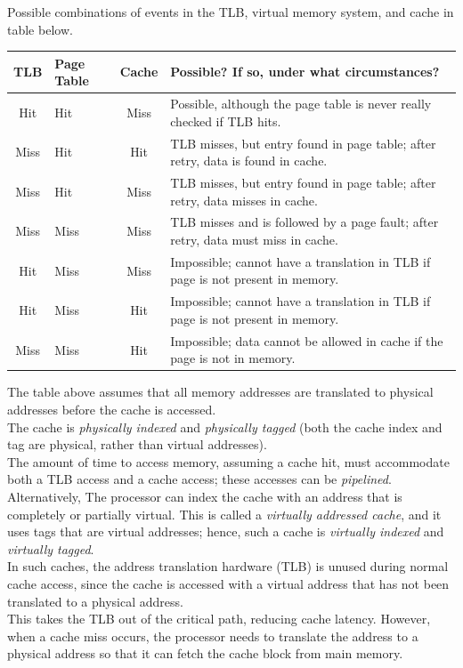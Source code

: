 \documentclass[12pt]{article}
\theoremstyle{definition}
\begin{document}
  Possible combinations of events in the TLB, virtual memory system, and cache in table below.
  \begin{center}
  \begin{tabular}{| c | C{1cm} | c | C{8cm} |}
  \hline
  TLB & Page Table & Cache & Possible? If so, under what circumstances? \\
  \hline
  Hit & Hit & Miss & Possible, although the page table is never really checked if TLB hits. \\
  \hline
  Miss & Hit & Hit & TLB misses, but entry found in page table; after retry, data is found in cache. \\
  \hline
  Miss & Hit & Miss & TLB misses, but entry found in page table; after retry, data misses in cache. \\
  \hline
  Miss & Miss & Miss & TLB misses and is followed by a page fault; after retry, data must miss in cache. \\
  \hline
  Hit & Miss & Miss & Impossible; cannot have a translation in TLB if page is not present in memory. \\
  \hline
  Hit & Miss & Hit & Impossible; cannot have a translation in TLB if page is not present in memory. \\
  \hline
  Miss & Miss & Hit & Impossible; data cannot be allowed in cache if the page is not in memory. \\
  \hline
  \end{tabular}
  \end{center}

  The table above assumes that all memory addresses are translated to physical addresses before the cache is accessed. \\
  The cache is \emph{physically indexed} and \emph{physically tagged} (both the cache index and tag are physical, rather than virtual addresses). \\
  The amount of time to access memory, assuming a cache hit, must accommodate both a TLB access and a cache access;
  these accesses can be \emph{pipelined}. \\

  Alternatively, The processor can index the cache with an address that is completely or partially virtual.
  This is called a \emph{virtually addressed cache}, and it uses tags that are virtual addresses;
  hence, such a cache is \emph{virtually indexed} and \emph{virtually tagged}. \\
  In such caches, the address translation hardware (TLB) is unused during normal cache access, since the cache is accessed with a virtual address that has not been translated to a physical address. \\
  This takes the TLB out of the critical path, reducing cache latency.
  However, when a cache miss occurs, the processor needs to translate the address to a physical address so that it can fetch the cache block from main memory. \\
\end{document}
